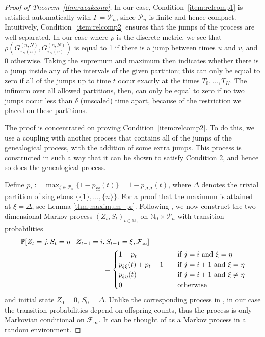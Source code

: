 \begin{proof}[Proof of Theorem~\ref{thm:weakconv}]
In our case, Condition~\ref{item:relcomp1} is satisfied automatically with $\Gamma = \mathcal{P}_n$, since $\mathcal{P}_n$ is finite and hence compact. 
Intuitively, Condition~\ref{item:relcomp2} ensures that the jumps of the process are well-separated. 
In our case where $\rho$ is the discrete metric, we see that $\rho( G_{\tau_N(u)}^{(n,N)}, G_{\tau_N(v)}^{(n,N)} )$ is equal to 1 if there is a jump between times $u$ and $v$, and 0 otherwise.
Taking the supremum and maximum then indicates whether there is a jump inside any of the intervals of the given partition; this can only be equal to zero if all of the jumps up to time $t$ occur exactly at the times $T_0, \dots, T_K$. 
The infimum over all allowed partitions, then, can only be equal to zero if no two jumps occur less than $\delta$ (unscaled) time apart, because of the restriction we placed on these partitions.

The proof is concentrated on proving Condition~\ref{item:relcomp2}.
To do this, we use a coupling with another process that contains all of the jumps of the genealogical process, with the addition of some extra jumps. This process is constructed in such a way that it can be shown to satisfy Condition 2, and hence so does the genealogical process.

Define $p_t := \max_{\xi\in \mathcal{P}_n} \{1 - p_{\xi\xi}(t)\} = 1 - p_{\Delta\Delta}(t)$, where $\Delta$ denotes the trivial partition of singletons $\{ \{1\},\dots, \{n\} \}$. For a proof that the maximum is attained at $\xi = \Delta$, see Lemma \ref{thm:maximum_pr}. 
Following \textcite{mohle1999}, we now construct the two-dimensional Markov process $(Z_t, S_t)_{t \in \mathbb{N}_0}$ on $\mathbb{N}_0 \times \mathcal{P}_n$ with transition probabilities
\begin{align}
\mathbb{P}[ Z_t = j , S_t = \eta \mid Z_{t-1} = i&, S_{t-1} = \xi, \mathcal{F}_\infty] \notag\\
&= \begin{cases}
1 - p_t &\quad \text{if } j=i \text{ and } \xi=\eta \\
p_{\xi\xi}(t) + p_t - 1  &\quad \text{if } j=i+1 \text{ and } \xi=\eta \\
p_{\xi\eta}(t) &\quad \text{if } j=i+1 \text{ and } \xi\neq\eta \\
0 &\quad \text{otherwise} 
\end{cases}
\label{eq:constructed_chain}
\end{align}
and initial state $Z_0=0$, $S_0 = \Delta$.
Unlike the corresponding process in \textcite{mohle1999}, in our case the transition probabilities depend on offspring counts, thus the process is only Markovian conditional on $\mathcal{F}_\infty$. It can be thought of as a Markov process in a random environment.


\end{proof}
